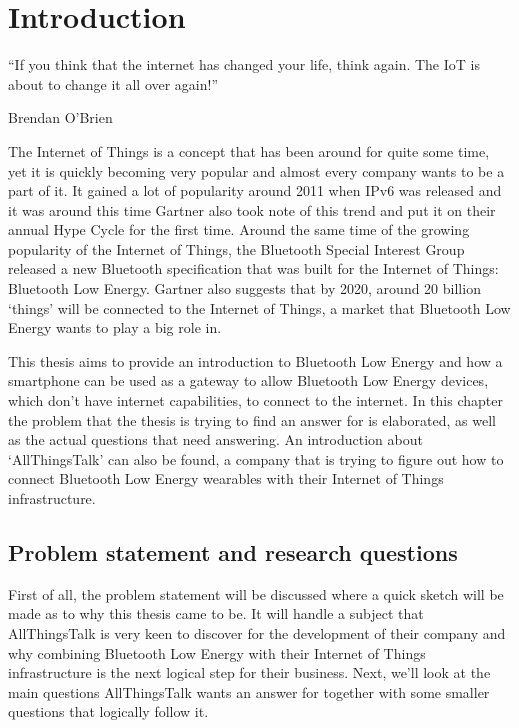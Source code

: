 \documentclass[pdftex,a4paper,12pt,twoside]{report}
\newcommand{\emptypage}{
\newpage
\thispagestyle{empty}
\mbox{}
\newpage
}
\begin{document}
\tableofcontents

\emptypage


\chapter{Introduction}
\label{ch:introduction}
\epigraph{``If you think that the internet has changed your life, think again. The IoT is about to change it all over again!''}{Brendan O'Brien}
The Internet of Things is a concept that has been around for quite some time, yet it is quickly becoming very popular and almost every company wants to be a part of it. It gained a lot of popularity around 2011 when IPv6 was released and it was around this time Gartner \citep{gartner2012} also took note of this trend and put it on their annual Hype Cycle for the first time. Around the same time of the growing popularity of the Internet of Things, the Bluetooth Special Interest Group released a new Bluetooth specification that was built for the Internet of Things: Bluetooth Low Energy. Gartner \citep{gartner2015} also suggests that by 2020, around 20 billion `things' will be connected to the Internet of Things, a market that Bluetooth Low Energy wants to play a big role in.

This thesis aims to provide an introduction to Bluetooth Low Energy and how a smartphone can be used as a gateway to allow Bluetooth Low Energy devices, which don't have internet capabilities, to connect to the internet. In this chapter the problem that the thesis is trying to find an answer for is elaborated, as well as the actual questions that need answering. An introduction about `AllThingsTalk' can also be found, a company that is trying to figure out how to connect Bluetooth Low Energy wearables with their Internet of Things infrastructure.

\newpage{}
\section{Problem statement and research questions}
\label{sec:problemdefinition}
First of all, the problem statement will be discussed where a quick sketch will be made as to why this thesis came to be. It will handle a subject that AllThingsTalk is very keen to discover for the development of their company and why combining Bluetooth Low Energy with their Internet of Things infrastructure is the next logical step for their business. Next, we'll look at the main questions AllThingsTalk wants an answer for together with some smaller questions that logically follow it.
\end{document}
